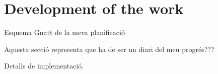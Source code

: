 \section{Development of the work}
Esquema Gnatt de la meva planificació

Aquesta secció representa que ha de ser un diari del meu progrés???

Detalls de implementació.